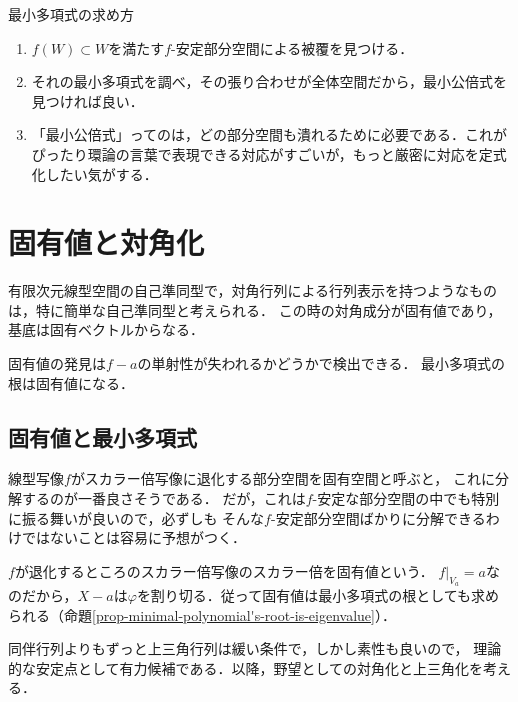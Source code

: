 \documentclass[uplatex, dvipdfmx]{jsreport}
\begin{document}
\begin{itembox}[l]{最小多項式の求め方}
    \begin{enumerate}
        \item $f(W)\subset W$を満たす$f$-安定部分空間による被覆を見つける．
        \item それの最小多項式を調べ，その張り合わせが全体空間だから，最小公倍式を見つければ良い．
        \item 「最小公倍式」ってのは，どの部分空間も潰れるために必要である．これがぴったり環論の言葉で表現できる対応がすごいが，もっと厳密に対応を定式化したい気がする．
    \end{enumerate}
\end{itembox}

\section{固有値と対角化}

\begin{tcolorbox}[colframe=ForestGreen, colback=ForestGreen!10!white, breakable]
    有限次元線型空間の自己準同型で，対角行列による行列表示を持つようなものは，特に簡単な自己準同型と考えられる．
    この時の対角成分が固有値であり，基底は固有ベクトルからなる．

    固有値の発見は$f-a$の単射性が失われるかどうかで検出できる．
    最小多項式の根は固有値になる．
\end{tcolorbox}

\subsection{固有値と最小多項式}

\begin{tcolorbox}[colframe=ForestGreen, colback=ForestGreen!10!white, breakable]
    線型写像$f$がスカラー倍写像に退化する部分空間を固有空間と呼ぶと，
    これに分解するのが一番良さそうである．
    だが，これは$f$-安定な部分空間の中でも特別に振る舞いが良いので，必ずしも
    そんな$f$-安定部分空間ばかりに分解できるわけではないことは容易に予想がつく．

    $f$が退化するところのスカラー倍写像のスカラー倍を固有値という．
    $f|_{V_a}=a$なのだから，$X-a$は$\varphi$を割り切る．従って固有値は最小多項式の根としても求められる（命題\ref{prop-minimal-polynomial's-root-is-eigenvalue}）．

    同伴行列よりもずっと上三角行列は緩い条件で，しかし素性も良いので，
    理論的な安定点として有力候補である．以降，野望としての対角化と上三角化を考える．
\end{tcolorbox}
\end{document}
